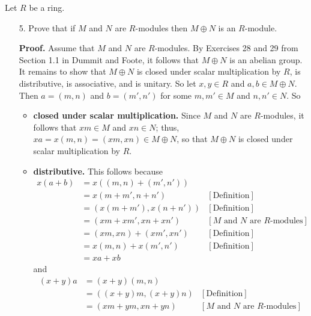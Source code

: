\documentclass[9pt]{article}
\begin{document}
Let $R$ be a ring.
\begin{enumerate}
   \item[5.]   Prove that if $M$ and $N$ are $R$-modules then
               $M \oplus N$ is an $R$-module.

      \textbf{Proof.} Assume that $M$ and $N$ are $R$-modules. By Exercises 28
      and 29 from Section 1.1 in Dummit and Foote, it follows that $M \oplus N$
      is an abelian group. It remains to show that $M \oplus N$ is closed under
      scalar multiplication by $R$, is distributive, is associative, and is
      unitary. So let $x, y \in R$ and $a, b \in M \oplus N$. Then $a = (m, n)$
      and $b = (m', n')$ for some $m, m' \in M$ and $n, n' \in N$. So 
      \begin{itemize}
         \item \textbf{closed under scalar multiplication.} Since $M$ and $N$
               are $R$-modules, it follows that $xm \in M$ and $xn \in N$; thus,
               $xa = x(m, n) = (xm, xn) \in M \oplus N$, so that $M \oplus N$
               is closed under scalar multiplication by $R$.
         \item \textbf{distributive.} This follows because
               \begin{align*}
                  x(a + b) &= x((m, n) + (m', n')) \\
                     &= x(m + m', n + n') &[\text{Definition}] \\
                     &= (x(m + m'), x(n + n')) &[\text{Definition}] \\
                     &= (xm + xm', xn + xn')
                        &[M\text{ and }N \text{ are } R\text{-modules}] \\
                     &= (xm, xn) + (xm', xn') &[\text{Definition}] \\
                     &= x(m, n) + x(m', n') &[\text{Definition}] \\
                     &= xa + xb
               \end{align*}
               and
               \begin{align*}
                  (x + y)a &= (x + y)(m, n) \\
                     &= ((x + y)m, (x + y)n) &[\text{Definition}] \\
                     &= (xm + ym, xn + yn)
                        &[M\text{ and }N \text{ are } R\text{-modules}] \\

\end{align*}
\end{itemize}
\end{enumerate}
\end{document}
